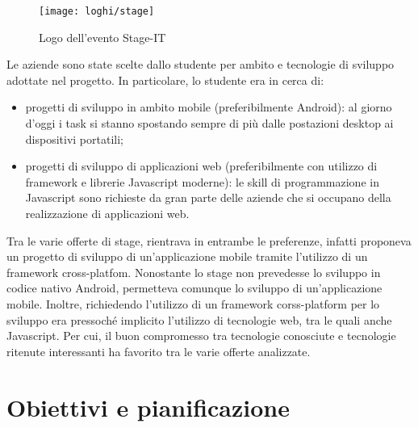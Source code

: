 \begin{figure}[!h] 
    \centering 
    \texttt{[image: loghi/stage]} 
    \caption{Logo dell'evento Stage-IT}
\end{figure}

Le aziende sono state scelte dallo studente per ambito e tecnologie di sviluppo adottate nel progetto. In particolare, lo studente era in cerca di:
\begin{itemize}
	\item progetti di sviluppo in ambito mobile (preferibilmente Android): al giorno d'oggi i task si stanno spostando sempre di più dalle postazioni desktop ai dispositivi portatili;
	\item progetti di sviluppo di applicazioni web (preferibilmente con utilizzo di framework e librerie Javascript moderne): le skill di programmazione in Javascript sono richieste da gran parte delle aziende che si occupano della realizzazione di applicazioni web.
\end{itemize}
Tra le varie offerte di stage, \visione{} rientrava in entrambe le preferenze, infatti proponeva un progetto di sviluppo di un'applicazione mobile tramite l'utilizzo di un framework cross-platfom. Nonostante lo stage non prevedesse lo sviluppo in codice nativo Android, permetteva comunque lo sviluppo di un'applicazione mobile. Inoltre, richiedendo l'utilizzo di un framework corss-platform per lo sviluppo era pressoché implicito l'utilizzo di tecnologie web, tra le quali anche Javascript. Per cui, il buon compromesso tra tecnologie conosciute e tecnologie ritenute interessanti ha favorito \visione{} tra le varie offerte analizzate.

\newpage

\section{Obiettivi e pianificazione}

